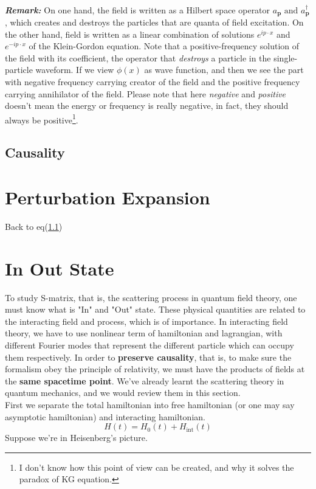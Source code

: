 \documentclass[12pt]{article}
\numberwithin{equation}{section}
\begin{document}
\\\indent \textit{\textbf{Remark:}} On one hand, the field is written as a Hilbert space operator $a_{\mathbf{p}} \text{ and }a^{\dagger}_{\mathbf{p}}$, which creates and destroys the particles that are quanta of field excitation.
On the other hand, field is written as a linear combination of solutions $e^{ip\cdot x}$ and $e^{-ip\cdot x}$ of the Klein-Gordon equation. 
Note that a positive-frequency solution of the field with its coefficient, the operator that \textit{destroys} a particle in the single-particle waveform. If we view $\phi(x)$ as wave function, and then we see the part with negative frequency carrying creator of the field and the positive frequency carrying annihilator of the field.
Please note that here \textit{negative} and \textit{positive} doesn't mean the energy or frequency is really negative, in fact, they should always be positive\footnote{I don't know how this point of view can be created, and why it solves the paradox of KG equation.}.
\subsection{Causality}

\section{Perturbation Expansion}
Back to eq(\hyperref[1.1]{1.1})

\section{In Out State}
To study S-matrix, that is, the scattering process in quantum field theory, one must know what is "In" and "Out" state.
These physical quantities are related to the interacting field and process, which is of importance.
In interacting field theory, we have to use nonlinear term of hamiltonian and lagrangian, with different Fourier modes that represent the different particle which can occupy them respectively.
In order to \textbf{preserve causality}, that is, to make sure the formalism obey the principle of relativity, we must have the products of fields at the \textbf{same spacetime point}.
We've already learnt the scattering theory in quantum mechanics, and we would review them in this section.
\\\indent First we separate the total hamiltonian into free hamiltonian (or one may say asymptotic hamiltonian) and interacting hamiltonian.
\begin{equation}
    H(t) = H_{0}(t) + H_{\text{int}}(t)
\end{equation}
Suppose we're in Heisenberg's picture.
\end{document}
